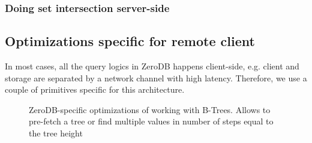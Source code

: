 \documentclass[notitlepage]{revtex4-1}
\begin{document}
\subsubsection{Doing set intersection server-side}




\subsection{Optimizations specific for remote client}

In most cases, all the query logics in ZeroDB happens client-side, e.g. client and storage are separated by a network channel with high latency.
Therefore, we use a couple of primitives specific for this architecture.

\begin{figure}
	\begin{center}
        \qquad
	\end{center}
    \caption{ZeroDB-specific optimizations of working with B-Trees. Allows to pre-fetch a tree or find multiple values in number of steps equal to the tree height}
	\label{fig:tree-traversal-optimizations}
\end{figure}
\end{document}
